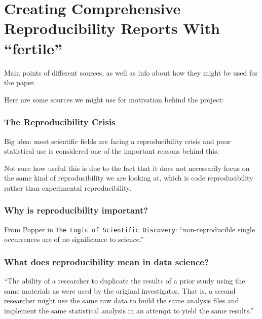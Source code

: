 \documentclass[12pt]{article}
\begin{document}
\section{\texorpdfstring{Creating Comprehensive Reproducibility Reports
With
``fertile''}{Creating Comprehensive Reproducibility Reports With fertile}}\label{creating-comprehensive-reproducibility-reports-with-fertile}

Main points of different sources, as well as info about how they might
be used for the paper.

Here are some sources we might use for motivation behind the project:

\subsubsection{The Reproducibility
Crisis}\label{the-reproducibility-crisis}

Big idea: most scientific fields are facing a reproducibility crisis and
poor statistical use is considered one of the important reasons behind
this.

Not sure how useful this is due to the fact that it does not necessarily
focus on the same kind of reproducibility we are looking at, which is
code reproducibility rather than experimental reproducibility.

\citet{baker20161}

\subsubsection{Why is reproducibility
important?}\label{why-is-reproducibility-important}

From Popper in \texttt{The\ Logic\ of\ Scientific\ Discovery}:
``non-reproducible single occurrences are of no significance to
science.''

\citet{popper2005logic}

\subsubsection{What does reproducibility mean in data
science?}\label{what-does-reproducibility-mean-in-data-science}

``The ability of a researcher to duplicate the results of a prior study
using the same materials as were used by the original investigator. That
is, a second researcher might use the same raw data to build the same
analysis files and implement the same statistical analysis in an attempt
to yield the same results.''
\end{document}
